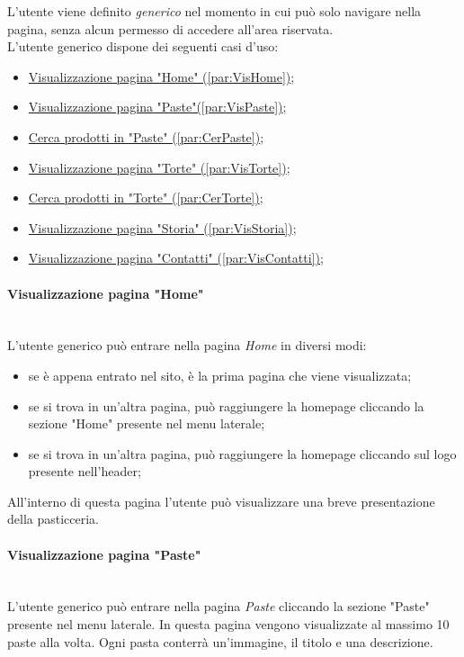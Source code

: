 L'utente viene definito \emph{generico} nel momento in cui può solo navigare nella pagina, senza alcun permesso di accedere all'area riservata.\\
L'utente generico dispone dei seguenti casi d'uso:
\begin{itemize}
	\item \hyperref[par:VisHome]{ Visualizzazione pagina "Home" (\ref{par:VisHome})};
	\item \hyperref[par:VisPaste]{ Visualizzazione pagina "Paste"(\ref{par:VisPaste})};
	\item \hyperref[par:CerPaste]{ Cerca prodotti in "Paste" (\ref{par:CerPaste})};
	\item \hyperref[par:VisTorte]{ Visualizzazione pagina "Torte" (\ref{par:VisTorte})};
	\item \hyperref[par:CerTorte]{ Cerca prodotti in "Torte" (\ref{par:CerTorte})};
	\item \hyperref[par:VisStoria]{ Visualizzazione pagina "Storia" (\ref{par:VisStoria})};
	\item \hyperref[par:VisContatti]{ Visualizzazione pagina "Contatti" (\ref{par:VisContatti})};
\end{itemize}

\paragraph{Visualizzazione pagina "Home"}\mbox{}\\
\label{par:VisHome}
L'utente generico può entrare nella pagina \emph{Home} in diversi modi:
\begin{itemize}
	\item se è appena entrato nel sito, è la prima pagina che viene visualizzata;
	\item se si trova in un'altra pagina, può raggiungere la homepage cliccando la sezione "Home" presente nel menu laterale;
	\item se si trova in un'altra pagina, può raggiungere la homepage cliccando sul logo presente nell'header;
\end{itemize}
All'interno di questa pagina l'utente può visualizzare una breve presentazione della pasticceria.\\

\paragraph{Visualizzazione pagina "Paste"}\mbox{}\\
\label{par:VisPaste}
L'utente generico può entrare nella pagina \emph{Paste} cliccando la sezione "Paste" presente nel menu laterale.
In questa pagina vengono visualizzate al massimo 10 paste alla volta. Ogni pasta conterrà un'immagine, il titolo e una descrizione.\\ 


